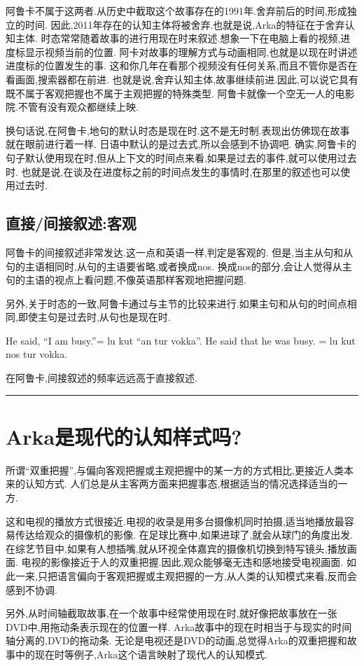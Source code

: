 阿鲁卡不属于这两者.从历史中截取这个故事存在的1991年.舍弃前后的时间,形成独立的时间.
因此,2011年存在的认知主体将被舍弃.也就是说,Arka的特征在于舍弃认知主体.
时态常常随着故事的进行用现在时来叙述.想象一下在电脑上看的视频,进度标显示视频当前的位置.
阿卡对故事的理解方式与动画相同,也就是以现在时讲述进度标的位置发生的事.
这和你几年在看那个视频没有任何关系,而且不管你是否在看画面,搜索器都在前进.
也就是说,舍弃认知主体,故事继续前进.因此,可以说它具有既不属于客观把握也不属于主观把握的特殊类型.
阿鲁卡就像一个空无一人的电影院.不管有没有观众都继续上映.

换句话说,在阿鲁卡,地句的默认时态是现在时.这不是无时制.表现出仿佛现在故事就在眼前进行着一样.
日语中默认的是过去式,所以会感到不协调吧.
确实,阿鲁卡的句子默认使用现在时,但从上下文的时间点来看,如果是过去的事件,就可以使用过去时.
也就是说,在谈及在进度标之前的时间点发生的事情时,在那里的叙述也可以使用过去时.

\subsection{直接/间接叙述:客观}
阿鲁卡的间接叙述非常发达.这一点和英语一样,判定是客观的.
但是,当主从句和从句的主语相同时,从句的主语要省略,或者换成nos.
换成nos的部分,会让人觉得从主句的主语的视点上看问题,不像英语那样客观地把握问题.

另外,关于时态的一致,阿鲁卡通过与主节的比较来进行.如果主句和从句的时间点相同,即使主句是过去时,从句也是现在时.

He said, “I am busy.”= lu kut ``an tur vokka''.
He said that he was busy. = lu kut nos tur vokka.

在阿鲁卡,间接叙述的频率远远高于直接叙述.
{\noindent} \rule[-10pt]{17.5cm}{0.05em}

\section{Arka是现代的认知样式吗?}
所谓“双重把握”,与偏向客观把握或主观把握中的某一方的方式相比,更接近人类本来的认知方式.
人们总是从主客两方面来把握事态,根据适当的情况选择适当的一方.

这和电视的播放方式很接近.电视的收录是用多台摄像机同时拍摄,适当地播放最容易传达给观众的摄像机的影像.
在足球比赛中,如果进球了,就会从球门的角度出发.在综艺节目中,如果有人想插嘴,就从环视全体嘉宾的摄像机切换到特写镜头,播放画面.
电视的影像接近于人的双重把握.因此,观众能够毫无违和感地接受电视画面.
如此一来,只把语言偏向于客观把握或主观把握的一方,从人类的认知模式来看,反而会感到不协调.

另外,从时间轴截取故事,在一个故事中经常使用现在时,就好像把故事放在一张DVD中,用拖动条表示现在的位置一样.
Arka故事中的现在时相当于与现实的时间轴分离的,DVD的拖动条.
无论是电视还是DVD的动画,总觉得Arka的双重把握和故事中的现在时等例子,Arka这个语言映射了现代人的认知模式.

